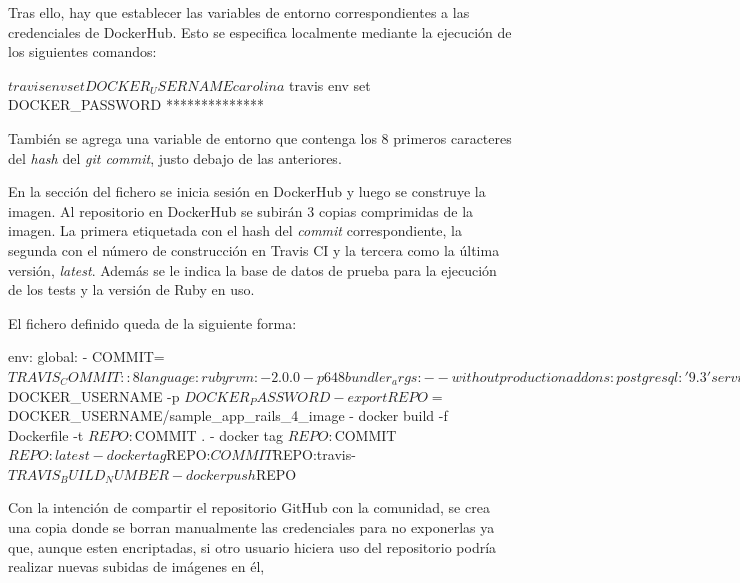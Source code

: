 Tras ello, hay que establecer las variables de entorno correspondientes a las credenciales de DockerHub. Esto se especifica localmente mediante la ejecución de los siguientes comandos:

\begin{code}
$ travis env set DOCKER_USERNAME carolina
$ travis env set DOCKER_PASSWORD **************
\end{code}

También se agrega una variable de entorno que contenga los 8 primeros caracteres del \textit{hash} del \textit{git commit}, justo debajo de las anteriores.

En la sección  del fichero se inicia sesión en DockerHub y luego se construye la imagen. Al repositorio en DockerHub se subirán 3 copias comprimidas de la imagen. La primera etiquetada con el hash del \textit{commit} correspondiente, la segunda con el número de construcción en Travis CI y la tercera como la última versión, \textit{latest}. Además se le indica la base de datos de prueba para la ejecución de los tests y la versión de Ruby en uso.

El fichero definido queda de la siguiente forma:

\begin{codelisting}
\label{code:travis}
\begin{code}
env:
  global:
  - COMMIT=${TRAVIS_COMMIT::8}
language: ruby
rvm:
- 2.0.0-p648
bundler_args: --without production
addons:
  postgresql: '9.3'
services:
- docker
before_script:
- cp config/database.yml.travis config/database.yml
- psql -c 'create database travis_ci_test;' -U postgres
- RAILS_ENV=test bundle exec rake db:migrate --trace
script:
- bundle exec rspec
notifications:
  email:
    recipients:
    - c.santanamartel@gmail.com
    on_success: always
    on_failure: always
sudo: required
after_success:
- docker login -u $DOCKER_USERNAME -p $DOCKER_PASSWORD
- export REPO=$DOCKER_USERNAME/sample_app_rails_4_image
- docker build -f Dockerfile -t $REPO:$COMMIT .
- docker tag $REPO:$COMMIT $REPO:latest
- docker tag $REPO:$COMMIT $REPO:travis-$TRAVIS_BUILD_NUMBER
- docker push $REPO  
\end{code}
\end{codelisting}

Con la intención de compartir el repositorio GitHub con la comunidad, se crea una copia donde se borran manualmente las credenciales  para no exponerlas ya que, aunque esten encriptadas, si otro usuario hiciera uso del repositorio podría realizar nuevas subidas de imágenes en él, 

